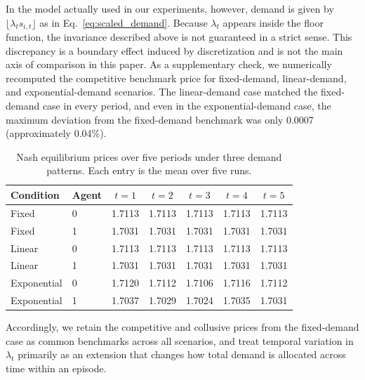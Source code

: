 \documentclass[runningheads]{llncs}
\begin{document}
In the model actually used in our experiments, however, demand is given by $\lfloor \lambda_t s_{i,t}\rfloor$ as in Eq.~\eqref{eq:scaled_demand}.
Because $\lambda_t$ appears inside the floor function, the invariance described above is not guaranteed in a strict sense.
This discrepancy is a boundary effect induced by discretization and is not the main axis of comparison in this paper.
As a supplementary check, we numerically recomputed the competitive benchmark price for fixed-demand, linear-demand, and exponential-demand scenarios.
The linear-demand case matched the fixed-demand case in every period, and even in the exponential-demand case, the maximum deviation from the fixed-demand benchmark was only 0.0007 (approximately 0.04\%).


\begin{table}[t]
\centering
\small
\setlength{\tabcolsep}{4pt}
\begin{tabular}{llccccc}
\hline
Condition & Agent & $t=1$ & $t=2$ & $t=3$ & $t=4$ & $t=5$ \\
\hline
Fixed        & 0 & 1.7113 & 1.7113 & 1.7113 & 1.7113 & 1.7113 \\
Fixed        & 1 & 1.7031 & 1.7031 & 1.7031 & 1.7031 & 1.7031 \\
Linear       & 0 & 1.7113 & 1.7113 & 1.7113 & 1.7113 & 1.7113 \\
Linear       & 1 & 1.7031 & 1.7031 & 1.7031 & 1.7031 & 1.7031 \\
Exponential  & 0 & 1.7120 & 1.7112 & 1.7106 & 1.7116 & 1.7112 \\
Exponential  & 1 & 1.7037 & 1.7029 & 1.7024 & 1.7035 & 1.7031 \\
\hline
\end{tabular}
\caption{Nash equilibrium prices over five periods under three demand patterns. Each entry is the mean over five runs.}
\label{tab:nash-price-demand-patterns}
\end{table}

\fi

Accordingly, we retain the competitive and collusive prices from the fixed-demand case as common benchmarks across all scenarios, and treat temporal variation in $\lambda_t$ primarily as an extension that changes how total demand is allocated across time within an episode.
\end{document}
